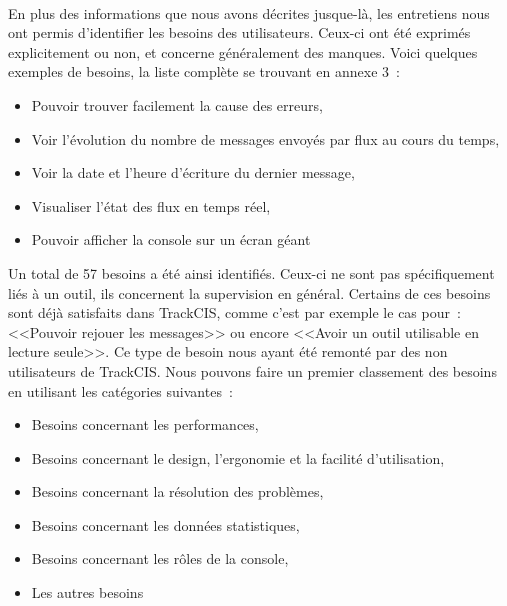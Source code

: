 			\paragraph{}%
			En plus des informations que nous avons décrites jusque-là, les entretiens
			nous ont permis d'identifier les besoins des utilisateurs. Ceux-ci ont été
			exprimés explicitement ou non, et concerne généralement des manques. Voici
			quelques exemples de besoins, la liste complète se trouvant en annexe 3~:
			\begin{itemize}
			  \item Pouvoir trouver facilement la cause des erreurs,
			  \item Voir l'évolution du nombre de messages envoyés par flux au cours du
			  temps,
			  \item Voir la date et l'heure d'écriture du dernier message,
			  \item Visualiser l'état des flux en temps réel,
			  \item Pouvoir afficher la console sur un écran géant
			\end{itemize}
			Un total de 57 besoins a été ainsi identifiés. Ceux-ci ne sont pas
			spécifiquement liés à un outil, ils concernent la supervision
			en général. Certains de ces besoins sont déjà satisfaits dans
			TrackCIS, comme c'est par exemple le cas pour~: <<Pouvoir rejouer les
			messages>> ou encore <<Avoir un outil utilisable en lecture seule>>. Ce type de
			besoin nous ayant été remonté par des non utilisateurs de TrackCIS. Nous
			pouvons faire un premier classement des besoins en utilisant les catégories
			suivantes~:
			\begin{itemize}
			  \item Besoins concernant les performances,
			  \item Besoins concernant le design, l'ergonomie et la facilité
			  d'utilisation,
			  \item Besoins concernant la résolution des problèmes,
			  \item Besoins concernant les données statistiques,
			  \item Besoins concernant les rôles de la console,
			  \item Les autres besoins
			\end{itemize}
			
